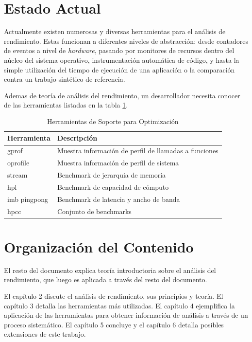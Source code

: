 \documentclass[a4paper]{report}
\begin{document}
\section{Estado Actual}

Actualmente existen numerosas y diversas herramientas para el an\'alisis de rendimiento.
Estas funcionan a diferentes niveles de abstracci\'on: desde contadores de eventos
a nivel de {\it hardware}, pasando por monitores de recursos dentro del n\'ucleo del sistema operativo,
instrumentaci\'on autom\'atica de c\'odigo, y hasta la simple utilizaci\'on del tiempo de ejecuci\'on 
de una aplicaci\'on o la comparaci\'on contra un trabajo sint\'etico de referencia.

\bigskip

Ademas de teor\'ia de an\'alisis del rendimiento, un desarrollador necesita
conocer de las herramientas listadas en la tabla \ref{table:tools}.

\begin{table}[H]
    \caption{Herramientas de Soporte para Optimizaci\'on}
    \centering
    \begin{tabular}{|l|l|}\hline
      {\bf Herramienta} & {\bf Descripci\'on} \\ \hline
      gprof & Muestra informaci\'on de perfil de llamadas a funciones \\ \hline
      oprofile & Muestra informaci\'on de perfil de sistema \\ \hline
      stream & Benchmark de jerarquia de memoria \\ \hline
      hpl & Benchmark de capacidad de c\'omputo \\ \hline
      imb pingpong & Benchmark de latencia y ancho de banda \\ \hline
      hpcc & Conjunto de benchmarks \\ \hline
    \end{tabular}
    \label{table:tools}
\end{table}

\section{Organizaci\'on del Contenido}

El resto del documento explica teor\'ia introductoria sobre el an\'alisis del rendimiento, que luego es
aplicada a trav\'es del resto del documento.

\bigskip

El cap\'itulo 2 discute el an\'alisis de rendimiento, sus
principios y teor\'ia. El cap\'itulo 3 detalla las herramientas m\'as
utilizadas. El cap\'itulo 4 ejemplifica la aplicaci\'on de las herramientas
para obtener informaci\'on de an\'alisis a trav\'es de un proceso sistem\'atico.
El cap\'itulo 5 concluye y el cap\'itulo 6 detalla posibles extensiones de este trabajo.
\end{document}
